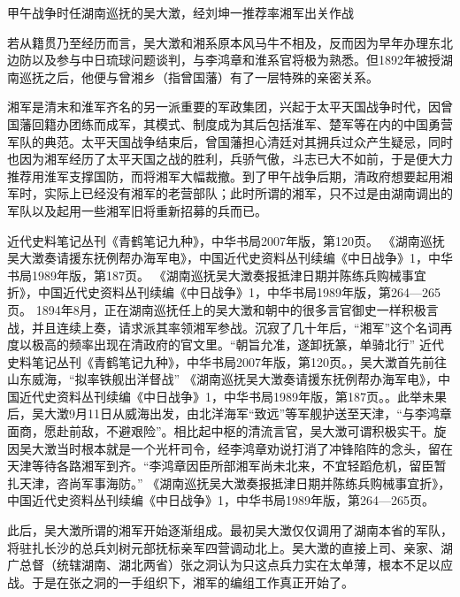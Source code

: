 \documentclass[12pt,UTF8]{ctexbook}
\begin{document}
甲午战争时任湖南巡抚的吴大澂，经刘坤一推荐率湘军出关作战

若从籍贯乃至经历而言，吴大澂和湘系原本风马牛不相及，反而因为早年办理东北边防以及参与中日琉球问题谈判，与李鸿章和淮系官将极为熟悉。但1892年被授湖南巡抚之后，他便与曾湘乡（指曾国藩）有了一层特殊的亲密关系。

湘军是清末和淮军齐名的另一派重要的军政集团，兴起于太平天国战争时代，因曾国藩回籍办团练而成军，其模式、制度成为其后包括淮军、楚军等在内的中国勇营军队的典范。太平天国战争结束后，曾国藩担心清廷对其拥兵过众产生疑忌，同时也因为湘军经历了太平天国之战的胜利，兵骄气傲，斗志已大不如前，于是便大力推荐用淮军支撑国防，而将湘军大幅裁撤。到了甲午战争后期，清政府想要起用湘军时，实际上已经没有湘军的老营部队；此时所谓的湘军，只不过是由湖南调出的军队以及起用一些湘军旧将重新招募的兵而已。

近代史料笔记丛刊《青鹤笔记九种》，中华书局2007年版，第120页。
《湖南巡抚吴大澂奏请援东抚例帮办海军电》，中国近代史资料丛刊续编《中日战争》1，中华书局1989年版，第187页。
《湖南巡抚吴大澂奏报抵津日期并陈练兵购械事宜折》，中国近代史资料丛刊续编《中日战争》1，中华书局1989年版，第264—265页。
1894年8月，正在湖南巡抚任上的吴大澂和朝中的很多言官御史一样积极言战，并且连续上奏，请求派其率领湘军参战。沉寂了几十年后，“湘军”这个名词再度以极高的频率出现在清政府的官文里。“朝旨允准，遂卸抚篆，单骑北行” 近代史料笔记丛刊《青鹤笔记九种》，中华书局2007年版，第120页。，吴大澂首先前往山东威海，“拟率铁舰出洋督战” 《湖南巡抚吴大澂奏请援东抚例帮办海军电》，中国近代史资料丛刊续编《中日战争》1，中华书局1989年版，第187页。。此举未果后，吴大澂9月11日从威海出发，由北洋海军“致远”等军舰护送至天津，“与李鸿章面商，愿赴前敌，不避艰险”。相比起中枢的清流言官，吴大澂可谓积极实干。旋因吴大澂当时根本就是一个光杆司令，经李鸿章劝说打消了冲锋陷阵的念头，留在天津等待各路湘军到齐。“李鸿章因臣所部湘军尚未北来，不宜轻蹈危机，留臣暂扎天津，咨尚军事海防。” 《湖南巡抚吴大澂奏报抵津日期并陈练兵购械事宜折》，中国近代史资料丛刊续编《中日战争》1，中华书局1989年版，第264—265页。

此后，吴大澂所谓的湘军开始逐渐组成。最初吴大澂仅仅调用了湖南本省的军队，将驻扎长沙的总兵刘树元部抚标亲军四营调动北上。吴大澂的直接上司、亲家、湖广总督（统辖湖南、湖北两省）张之洞认为只这点兵力实在太单薄，根本不足以应战。于是在张之洞的一手组织下，湘军的编组工作真正开始了。
\end{document}

